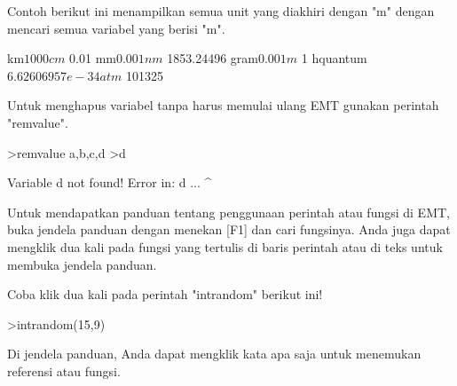 \documentclass[a4paper,10pt]{article}
\begin{document}
\begin{eulernotebook}
\begin{eulercomment}
\begin{eulercomment}
\begin{eulercomment}
\begin{eulercomment}
\begin{eulercomment}
Contoh berikut ini menampilkan semua unit yang diakhiri dengan "m"
dengan mencari semua variabel yang berisi "m\textdollar{}".
\end{eulercomment}
\begin{euleroutput}
  km$                 1000
  cm$                 0.01
  mm$                 0.001
  nm$                 1853.24496
  gram$               0.001
  m$                  1
  hquantum$           6.62606957e-34
  atm$                101325
\end{euleroutput}
\begin{eulercomment}
Untuk menghapus variabel tanpa harus memulai ulang EMT gunakan
perintah "remvalue".
\end{eulercomment}
\begin{eulerprompt}
>remvalue a,b,c,d
>d
\end{eulerprompt}
\begin{euleroutput}
  Variable d not found!
  Error in:
  d ...
   ^
\end{euleroutput}
\begin{eulercomment}
Untuk mendapatkan panduan tentang penggunaan perintah atau fungsi di EMT, buka
jendela panduan dengan menekan [F1] dan cari fungsinya. Anda juga dapat
mengklik dua kali pada fungsi yang tertulis di baris perintah atau di teks
untuk membuka jendela panduan.

Coba klik dua kali pada perintah "intrandom" berikut ini!
\end{eulercomment}
\begin{eulerprompt}
>intrandom(15,9)
\end{eulerprompt}
\begin{euleroutput}
  [6,  2,  9,  3,  5,  3,  5,  3,  3,  8,  3,  7,  2,  5,  3]
\end{euleroutput}
\begin{eulercomment}
Di jendela panduan, Anda dapat mengklik kata apa saja untuk menemukan
referensi atau fungsi.


\end{eulercomment}
\end{eulercomment}
\end{eulercomment}
\end{eulercomment}
\end{eulercomment}
\end{eulernotebook}
\end{document}
